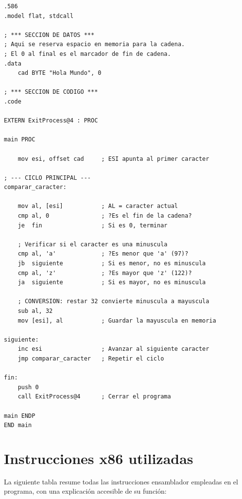 \documentclass[12pt, letterpaper]{article}
\begin{document}
\begin{lstlisting}[language=MASM, caption={conversion.asm --- Conversión de minúsculas a mayúsculas}]
.586
.model flat, stdcall

; *** SECCION DE DATOS ***
; Aqui se reserva espacio en memoria para la cadena.
; El 0 al final es el marcador de fin de cadena.
.data
    cad BYTE "Hola Mundo", 0

; *** SECCION DE CODIGO ***
.code

EXTERN ExitProcess@4 : PROC

main PROC

    mov esi, offset cad     ; ESI apunta al primer caracter

; --- CICLO PRINCIPAL ---
comparar_caracter:

    mov al, [esi]           ; AL = caracter actual
    cmp al, 0               ; ?Es el fin de la cadena?
    je  fin                 ; Si es 0, terminar

    ; Verificar si el caracter es una minuscula
    cmp al, 'a'             ; ?Es menor que 'a' (97)?
    jb  siguiente           ; Si es menor, no es minuscula
    cmp al, 'z'             ; ?Es mayor que 'z' (122)?
    ja  siguiente           ; Si es mayor, no es minuscula

    ; CONVERSION: restar 32 convierte minuscula a mayuscula
    sub al, 32
    mov [esi], al           ; Guardar la mayuscula en memoria

siguiente:
    inc esi                 ; Avanzar al siguiente caracter
    jmp comparar_caracter   ; Repetir el ciclo

fin:
    push 0
    call ExitProcess@4      ; Cerrar el programa

main ENDP
END main
\end{lstlisting}

\section{Instrucciones x86 utilizadas}

La siguiente tabla resume todas las instrucciones ensamblador empleadas en el programa, con una explicación accesible de su función:
\end{document}
